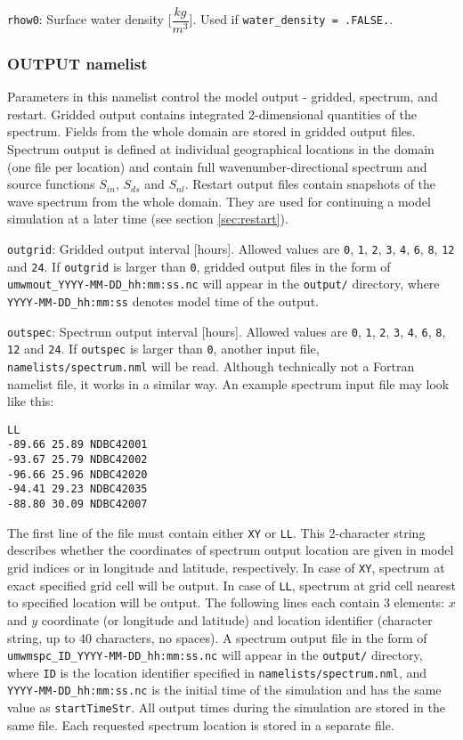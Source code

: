\documentclass[letterpaper]{article}
\numberwithin{equation}{section}
\begin{document}
\verb+rhow0+:
Surface water density [$\dfrac{kg}{m^{3}}$]. Used if \verb+water_density = .FALSE.+.

\subsubsection{OUTPUT namelist}
\label{sec:output_namelist}

Parameters in this namelist control the model output - 
gridded, spectrum, and restart.
Gridded output contains integrated 2-dimensional quantities of the spectrum.
Fields from the whole domain are stored in gridded output files.
Spectrum output is defined at individual geographical locations in the domain
(one file per location) and contain full wavenumber-directional spectrum and 
source functions $S_{in}$, $S_{ds}$ and $S_{nl}$.
Restart output files contain snapshots of the wave spectrum from the whole domain.
They are used for continuing a model simulation at a later time (see section \ref{sec:restart}).

\verb+outgrid+:
Gridded output interval [hours]. 
Allowed values are \verb+0+, \verb+1+, \verb+2+, \verb+3+, \verb+4+, \verb+6+, \verb+8+, \verb+12+ and \verb+24+.
If \verb+outgrid+ is larger than \verb+0+, gridded output files in the form of
\verb+umwmout_YYYY-MM-DD_hh:mm:ss.nc+ will appear in the \verb+output/+ directory,
where \verb+YYYY-MM-DD_hh:mm:ss+ denotes model time of the output.

\verb+outspec+:
Spectrum output interval [hours].
Allowed values are \verb+0+, \verb+1+, \verb+2+, \verb+3+, \verb+4+, \verb+6+, \verb+8+, \verb+12+ and \verb+24+.
If \verb+outspec+ is larger than \verb+0+, another input file, \verb+namelists/spectrum.nml+
will be read.
Although technically not a Fortran namelist file, it works in a similar way.
An example spectrum input file may look like this:

\begin{verbatim}
LL
-89.66 25.89 NDBC42001
-93.67 25.79 NDBC42002
-96.66 25.96 NDBC42020
-94.41 29.23 NDBC42035
-88.80 30.09 NDBC42007
\end{verbatim}

The first line of the file must contain either \verb+XY+ or \verb+LL+.
This 2-character string describes whether the coordinates of spectrum output location
are given in model grid indices or in longitude and latitude, respectively.
In case of \verb+XY+, spectrum at exact specified grid cell will be output.
In case of \verb+LL+, spectrum at grid cell nearest to specified location will be output.
The following lines each contain 3 elements: $x$ and $y$ coordinate (or longitude and latitude)
and location identifier (character string, up to 40 characters, no spaces).
A spectrum output file in the form of \verb+umwmspc_ID_YYYY-MM-DD_hh:mm:ss.nc+ 
will appear in the \verb+output/+ directory,
where \verb+ID+ is the location identifier specified in \verb+namelists/spectrum.nml+,
and \verb+YYYY-MM-DD_hh:mm:ss.nc+ is the initial time of the simulation
and has the same value as \verb+startTimeStr+.
All output times during the simulation are stored in the same file.
Each requested spectrum location is stored in a separate file.
\end{document}
